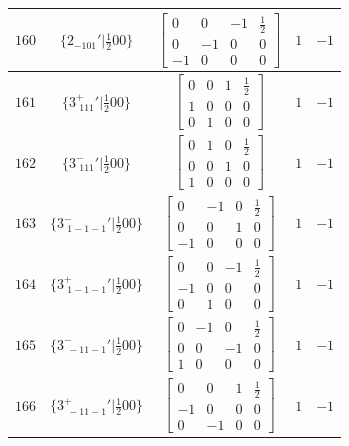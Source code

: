 \documentclass[fleqn,8pt]{jsarticle}
\begin{document}
\begin{longtable}{ccccc}
$ 160 $ & $ \{2{}_{-101}{}'|\frac{1}{2} 0 0\} $ & $ \begin{bmatrix} 0 & 0 & -1 & \frac{1}{2} \\ 0 & -1 & 0 & 0 \\ -1 & 0 & 0 & 0 \end{bmatrix} $ & $ 1 $ & $ -1 $ \\ \hline
$ 161 $ & $ \{3^{+}_{\,\,111}{}'|\frac{1}{2} 0 0\} $ & $ \begin{bmatrix} 0 & 0 & 1 & \frac{1}{2} \\ 1 & 0 & 0 & 0 \\ 0 & 1 & 0 & 0 \end{bmatrix} $ & $ 1 $ & $ -1 $ \\ \hline
$ 162 $ & $ \{3^{-}_{\,\,111}{}'|\frac{1}{2} 0 0\} $ & $ \begin{bmatrix} 0 & 1 & 0 & \frac{1}{2} \\ 0 & 0 & 1 & 0 \\ 1 & 0 & 0 & 0 \end{bmatrix} $ & $ 1 $ & $ -1 $ \\ \hline
$ 163 $ & $ \{3^{-}_{\,\,1-1-1}{}'|\frac{1}{2} 0 0\} $ & $ \begin{bmatrix} 0 & -1 & 0 & \frac{1}{2} \\ 0 & 0 & 1 & 0 \\ -1 & 0 & 0 & 0 \end{bmatrix} $ & $ 1 $ & $ -1 $ \\ \hline
$ 164 $ & $ \{3^{+}_{\,\,1-1-1}{}'|\frac{1}{2} 0 0\} $ & $ \begin{bmatrix} 0 & 0 & -1 & \frac{1}{2} \\ -1 & 0 & 0 & 0 \\ 0 & 1 & 0 & 0 \end{bmatrix} $ & $ 1 $ & $ -1 $ \\ \hline
$ 165 $ & $ \{3^{-}_{\,\,-11-1}{}'|\frac{1}{2} 0 0\} $ & $ \begin{bmatrix} 0 & -1 & 0 & \frac{1}{2} \\ 0 & 0 & -1 & 0 \\ 1 & 0 & 0 & 0 \end{bmatrix} $ & $ 1 $ & $ -1 $ \\ \hline
$ 166 $ & $ \{3^{+}_{\,\,-11-1}{}'|\frac{1}{2} 0 0\} $ & $ \begin{bmatrix} 0 & 0 & 1 & \frac{1}{2} \\ -1 & 0 & 0 & 0 \\ 0 & -1 & 0 & 0 \end{bmatrix} $ & $ 1 $ & $ -1 $ \\ \hline

\end{longtable}
\end{document}
